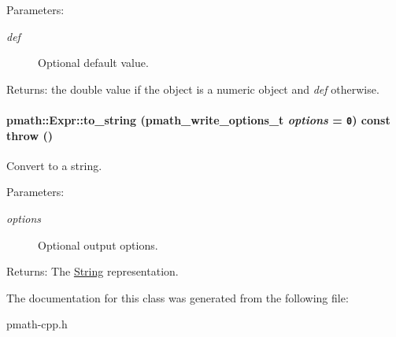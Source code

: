 \begin{Desc}
\item[Parameters:]
\begin{description}
\item[{\em def}]Optional default value. \end{description}
\end{Desc}
\begin{Desc}
\item[Returns:]the double value if the object is a numeric object and {\em def\/} otherwise. \end{Desc}
\hypertarget{classpmath_1_1_expr_4d5eb55adc498f44bdc6a5eb8affecaa}{
\paragraph[{to\_\-string}]{ pmath::Expr::to\_\-string ({\bf pmath\_\-write\_\-options\_\-t} {\em options} = {\tt 0}) const  throw ()}\hfill}
\label{classpmath_1_1_expr_4d5eb55adc498f44bdc6a5eb8affecaa}


Convert to a string. 

\begin{Desc}
\item[Parameters:]
\begin{description}
\item[{\em options}]Optional output options. \end{description}
\end{Desc}
\begin{Desc}
\item[Returns:]The \hyperlink{classpmath_1_1_string}{String} representation. \end{Desc}


The documentation for this class was generated from the following file:\begin{CompactItemize}
\item 
pmath-cpp.h\end{CompactItemize}
